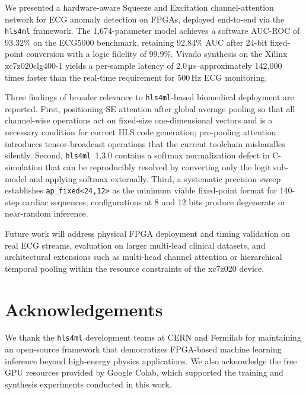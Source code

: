 \documentclass[12pt, letterpaper]{article}
\begin{document}
We presented a hardware-aware Squeeze and Excitation channel-attention
network for ECG anomaly detection on FPGAs, deployed end-to-end via the
\texttt{hls4ml}  framework. The 1,674-parameter model achieves
a software AUC-ROC of 93.32\% on the ECG5000 benchmark, retaining
92.84\% AUC after 24-bit fixed-point conversion with a logic fidelity of
99.9\%. Vivado synthesis on the Xilinx xc7z020clg400-1 yields a
per-sample latency of 2.0\,\si{\micro\second}--approximately 142,000
times faster than the real-time requirement for 500\,Hz ECG monitoring.

Three findings of broader relevance to \texttt{hls4ml}-based biomedical
deployment are reported. First, positioning SE attention after global
average pooling so that all channel-wise operations act on
fixed-size one-dimensional vectors and is a necessary condition for correct
HLS code generation; pre-pooling attention introduces tensor-broadcast
operations that the current toolchain mishandles silently. Second,
\texttt{hls4ml}~1.3.0 contains a softmax normalization defect in
C-simulation that can be reproducibly resolved by converting only the
logit sub-model and applying softmax externally. Third, a systematic
precision sweep establishes \texttt{ap\_fixed<24,12>} as the minimum
viable fixed-point format for 140-step cardiac sequences; configurations
at 8 and 12 bits produce degenerate or near-random inference.

Future work will address physical FPGA deployment and timing validation
on real ECG streams, evaluation on larger multi-lead clinical datasets,
and architectural extensions such as multi-head channel attention or
hierarchical temporal pooling within the resource constraints of the
xc7z020 device.

\section*{Acknowledgements}

We thank the \texttt{hls4ml} development teams at CERN and Fermilab for maintaining an open-source framework that democratizes FPGA-based machine learning inference beyond high-energy physics applications. We also acknowledge the free GPU resources provided by Google Colab, which supported the training and synthesis experiments conducted in this work.

\end{document}
